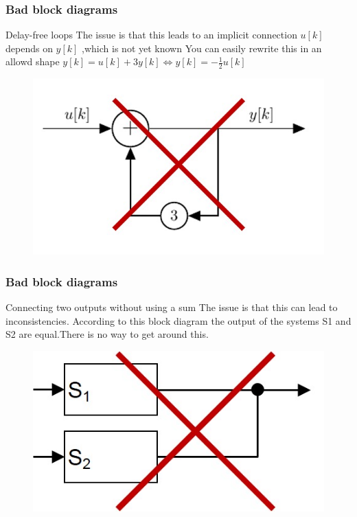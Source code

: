 \begin{frame}
	\frametitle{Bad block diagrams}

				\begin{alertblock}{Delay-free loops}
					The issue is that this leads to an implicit connection 
					$u[k]$ depends on $y[k]$ ,which is not yet known
					You can easily rewrite this in an allowd shape
					$y[k] = u[k]  + 3 y[k] \Longleftrightarrow y[k] = -\frac{1}{2} u[k]$
\begin{figure}
\centering
\includegraphics[height=0.4\textheight]{Images/discrete_time_systems_4}
\label{fig:discrete_time_systems_4}
\end{figure}
				\end{alertblock}

	
\end{frame}
\begin{frame}
	\frametitle{Bad block diagrams}
		\begin{alertblock}{Connecting two outputs without using a sum}
			The issue is that this can lead to inconsistencies.	According to this block diagram the output of the systems S1 and S2 are equal.There is no way to get around this.
			\begin{figure}
				\centering
				\includegraphics[width = 0.5\linewidth]{Images/discrete_time_systems_5}
				\label{fig:discrete_time_systems_5}
			\end{figure}
		\end{alertblock}
\end{frame}
